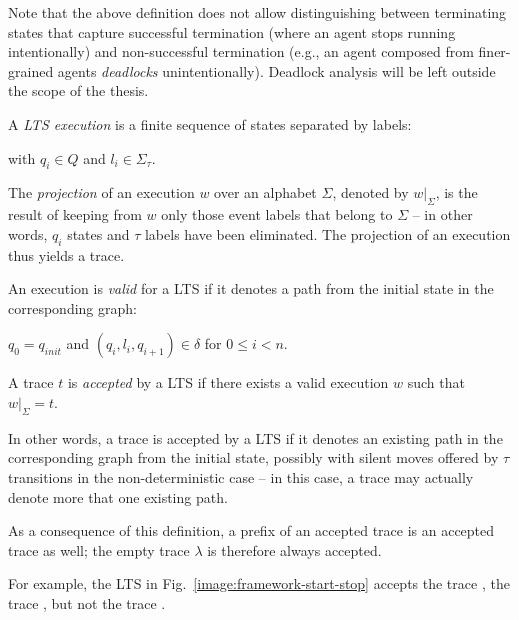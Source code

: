 Note that the above definition does not allow distinguishing between terminating states that capture successful termination (where an agent stops running intentionally) and non-successful termination (e.g., an agent composed from finer-grained agents \emph{deadlocks} unintentionally). Deadlock analysis will be left outside the scope of the thesis.

\begin{definition}
A \emph{LTS execution} is a finite sequence of states separated by labels:
\begin{center}
\end{center}
\noindent with $q_i \in Q$ and $l_i \in \Sigma_{\tau}$. 
\end{definition}

The \emph{projection} of an execution $w$ over an alphabet $\Sigma$, denoted by $w|_{\Sigma}$, is the result of keeping from $w$ only those event labels that belong to $\Sigma$ -- in other words, $q_i$ states and $\tau$ labels have been eliminated. The projection of an execution thus yields a trace. 

\begin{definition}
An execution is \emph{valid} for a LTS if it denotes a path from the initial state in the corresponding graph:
\begin{center}
$q_0 = q_{init}$ and $(q_i,l_i,q_{i+1}) \in \delta$ for $0 \leq i < n$. 
\end{center}
\end{definition}

\begin{definition}
A trace $t$ is \emph{accepted} by a LTS if there exists a valid execution $w$ such that $w|_{\Sigma} = t$. 
\end{definition}

In other words, a trace is accepted by a LTS if it denotes an existing path in the corresponding graph from the initial state, possibly with silent moves offered by $\tau$ transitions in the non-deterministic case -- in this case, a trace may actually denote more that one existing path. 

As a consequence of this definition, a prefix of an accepted trace is an accepted trace as well; the empty trace $\lambda$ is therefore always accepted. 

For example, the LTS in Fig.~\ref{image:framework-start-stop} accepts the trace , the trace , but not the trace . 

